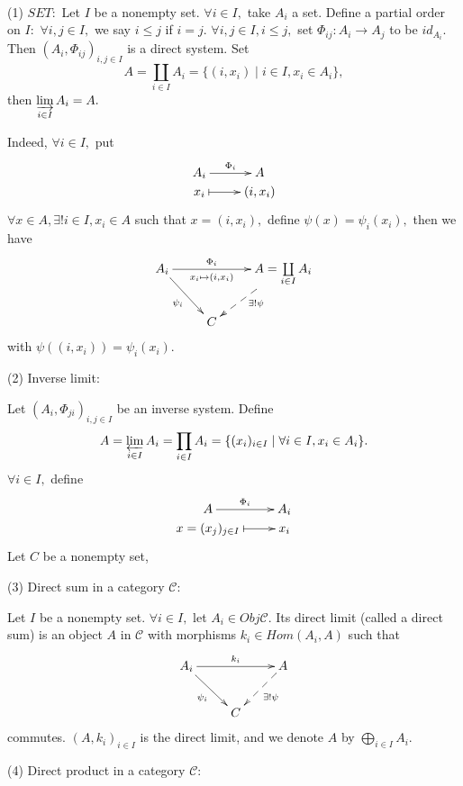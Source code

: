 \begin{egs}\
\enum
\item[(1)]$SET:$ Let $I$ be a nonempty set. $\forall i\in I,$ take
$A_i$ a set. Define a partial order on $I:$ $\forall i,j\in I,$ we
say $i\leqslant j$ if $i=j.$ $\forall i,j\in I, i\leqslant j,$ set
$\Phi_{ij}: A_i\rightarrow A_j$ to be $id_{A_i}.$ Then
$(A_i,\Phi_{ij})_{i,j\in I}$ is a direct system. Set
$$A=\coprod\limits_{i\in I}A_i=\{(i,x_i)\mid i\in I,x_i\in A_i\},$$
then $\varinjlim\limits_{i\in I}A_i=A.$

Indeed, $\forall i\in I,$ put
\[ \xymatrix@R=0em{
   A_i \ar[r]^-{\Phi_i} & A \\
   x_i \ar@{|->}[r] & (i,x_i) }  \]
$\forall x\in A, \exists!i\in I,x_i\in A$ such that $x=(i,x_i),$
define $\psi(x)=\psi_i(x_i),$ then we have
\[ \xymatrix{
   A_i \ar[rr]^-{\Phi_i}_-{x_i\mapsto(i,x_i)} \ar[dr]_{\psi_i} & &
   {A=\coprod\limits_{i\in I}A_i} \ar@{-->}[dl]^{\exists!\psi}  \\
   & C }  \]
with $\psi((i,x_i))=\psi_i(x_i).$
\item[(2)]Inverse limit:

Let $(A_i,\Phi_{ji})_{i,j\in I}$ be an inverse system. Define
$$A=\varprojlim\limits_{i\in I}A_i=\prod\limits_{i\in I}A_i =
\{(x_i)_{i\in I}\mid \forall i\in I,x_i\in A_i\}.$$ $\forall i\in
I,$ define
\[ \xymatrix@R=0em{
   A \ar[r]^-{\Phi_i} & A_i \\
   x=(x_j)_{j\in I} \ar@{|->}[r] & x_i }  \]
Let $C$ be a nonempty set,
\item[(3)]Direct sum in a category $\mathscr{C}:$

Let $I$ be a nonempty set. $\forall i\in I,$ let $A_i\in
Obj\mathscr{C}.$ Its direct limit (called a direct sum) is an object
$A$ in $\mathscr{C}$ with morphisms $k_i\in Hom(A_i,A)$ such that
\[ \xymatrix{
   A_i \ar[rr]^-{k_i} \ar[dr]_{\psi_i} & & A \ar@{-->}[dl]^{\exists!\psi}\\
   & C }  \]
commutes. $(A,k_i)_{i\in I}$ is the direct limit, and we denote $A$
by $\bigoplus\limits_{i\in I}A_i.$
\item[(4)]Direct product in a category $\mathscr{C}:$


\end{egs}
